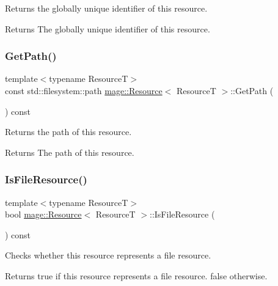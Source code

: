 Returns the globally unique identifier of this resource.

\begin{DoxyReturn}{Returns}
The globally unique identifier of this resource. 
\end{DoxyReturn}
\mbox{\label{classmage_1_1_resource_a7611d0317a247d324d432b26aab6aee2}} 
\subsubsection{\texorpdfstring{Get\+Path()}{GetPath()}}
{\footnotesize\ttfamily template$<$typename ResourceT$>$ \\
const std\+::filesystem\+::path \mbox{\hyperlink{classmage_1_1_resource}{mage\+::\+Resource}}$<$ ResourceT $>$\+::Get\+Path (\begin{DoxyParamCaption}{ }\end{DoxyParamCaption}) const}

Returns the path of this resource.

\begin{DoxyReturn}{Returns}
The path of this resource. 
\end{DoxyReturn}
\mbox{\label{classmage_1_1_resource_ae783140e30a974c8820e5ae8be9e4b44}} 
\subsubsection{\texorpdfstring{Is\+File\+Resource()}{IsFileResource()}}
{\footnotesize\ttfamily template$<$typename ResourceT$>$ \\
bool \mbox{\hyperlink{classmage_1_1_resource}{mage\+::\+Resource}}$<$ ResourceT $>$\+::Is\+File\+Resource (\begin{DoxyParamCaption}{ }\end{DoxyParamCaption}) const}

Checks whether this resource represents a file resource.

\begin{DoxyReturn}{Returns}
{\ttfamily true} if this resource represents a file resource. {\ttfamily false} otherwise. 
\end{DoxyReturn}
\mbox{\label{classmage_1_1_resource_a938159cb02ec565b9b957f993db4769d}} 
